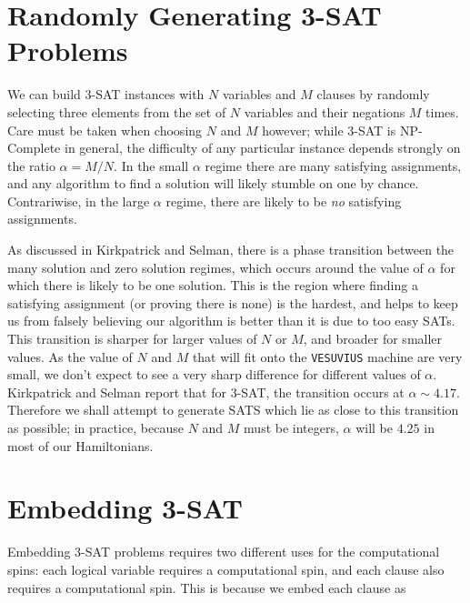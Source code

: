 \section{Randomly Generating 3-SAT Problems}
We can build 3-SAT instances with $N$ variables and $M$ clauses by randomly selecting three elements from the set of $N$ variables and their negations $M$ times.  Care must be taken when choosing $N$ and $M$ however; while 3-SAT is NP-Complete in general, the difficulty of any particular instance depends strongly on the ratio $\alpha = M/N$\cite{Kirkpatrick}.  In the small $\alpha$ regime there are many satisfying assignments, and any algorithm to find a solution will likely stumble on one by chance.  Contrariwise, in the large $\alpha$ regime, there are likely to be \emph{no} satisfying assignments.

As discussed in Kirkpatrick and Selman\cite{Kirkpatrick}, there is a phase transition between the many solution and zero solution regimes, which occurs around the value of $\alpha$ for which there is likely to be one solution.  This is the region where finding a satisfying assignment (or proving there is none) is the hardest, and helps to keep us from falsely believing our algorithm is better than it is due to too easy SATs.  This transition is sharper for larger values of $N$ or $M$, and broader for smaller values.  As the value of $N$ and $M$ that will fit onto the \texttt{VESUVIUS} machine are very small, we don't expect to see a very sharp difference for different values of $\alpha$.  Kirkpatrick and Selman report that for 3-SAT, the transition occurs at $\alpha \sim 4.17$.  Therefore we shall attempt to generate SATS which lie as close to this transition as possible; in practice, because $N$ and $M$ must be integers, $\alpha$ will be $4.25$ in most of our Hamiltonians.

\section{Embedding 3-SAT}
Embedding 3-SAT problems requires two different uses for the computational spins: each logical variable requires a computational spin, and each clause also requires a computational spin.  This is because we embed each clause as 
